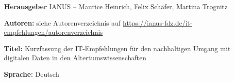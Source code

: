 \newcommand{\tbsf}[1]{{\color{ianusBlau}\sffamily\normalsize#1}}

\newcommand{\tbsff}[1]{{\color{ianusBlau}\sffamily\bfseries#1}}

\renewcommand{\arraystretch}{1.2}

\thispagestyle{empty}

\begin{flushleft}
\tbsff{Herausgeber} IANUS -- Maurice Heinrich, Felix Schäfer, Martina Trognitz \vspace{2mm}

\tbsff{Autoren:} siehe Autorenverzeichnis auf \url{https://ianus-fdz.de/it-empfehlungen/autorenverzeichnis} \vspace{2mm}

\tbsff{Titel:} Kurzfassung der IT-Empfehlungen für den nachhaltigen Umgang mit digitalen Daten in den Altertumswissenschaften \vspace{2mm}

\tbsff{Sprache:} Deutsch \vspace{4mm}


\end{flushleft}

\begin{center}
\end{center}%


